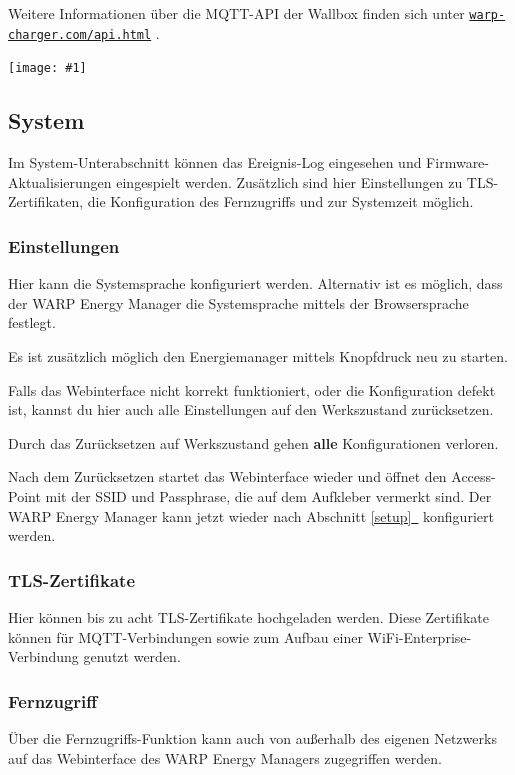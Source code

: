 \documentclass[a4paper,10pt]{article}
\newcommand{\hint}[1]{\begin{tcolorbox}[colback=boxgray,colframe=black,coltext=
white,title=Hinweis,left*=2mm,right*=2mm,boxsep=1mm,bottom=1mm,top=1mm]#1\end{tcolorbox}}
\newcommand{\gfx}[1]{\texttt{[image: \#1]}}
\newcommand*{\fullref}[1]{Abschnitt \hyperref[{#1}]{\ref*{#1}~\nameref*{#1}}}
\newcommand\rurl[2]{%
  \href{#1}{\nolinkurl{#2}}%
}
\begin{document}
\begin{multicols*}{2}
    Weitere Informationen über die MQTT-API der Wallbox finden sich unter
	\rurl{https://warp-charger.com/api.html}{warp-charger.com/api.html}.

	\gfx{./img/resized/web_mqtt}

	\subsection{System}
    Im System-Unterabschnitt können das Ereignis-Log eingesehen und Firmware-Aktualisierungen eingespielt werden. Zusätzlich sind hier Einstellungen zu TLS-Zertifikaten, die Konfiguration des Fernzugriffs und zur Systemzeit möglich.
    
    \subsubsection{Einstellungen}
    \label{einstellungen}
    
    Hier kann die Systemsprache konfiguriert werden. Alternativ ist es möglich, dass der WARP Energy Manager
    die Systemsprache mittels der Browsersprache festlegt.
    
    Es ist zusätzlich möglich den Energiemanager mittels Knopfdruck neu zu starten.
    
	Falls das Webinterface nicht korrekt funktioniert, oder die Konfiguration defekt ist,
	kannst du hier auch alle Einstellungen auf den Werkszustand zurücksetzen.
	\hint{Durch das Zurücksetzen auf Werkszustand gehen \mbox{\textbf{alle}} Konfigurationen verloren.}
	Nach dem Zurücksetzen startet das Webinterface wieder und öffnet
	den Access-Point mit der SSID und Passphrase, die auf dem Aufkleber vermerkt
	sind. Der WARP Energy Manager kann jetzt wieder nach \fullref{setup} konfiguriert werden.
    
    
    \subsubsection{TLS-Zertifikate}
    Hier können bis zu acht TLS-Zertifikate hochgeladen werden. Diese Zertifikate können
    für MQTT-Verbindungen sowie zum Aufbau einer WiFi-Enterprise-Verbindung genutzt werden.
    
    \subsubsection{Fernzugriff}

    Über die Fernzugriffs-Funktion kann auch von außerhalb des eigenen Netzwerks auf das Webinterface des WARP Energy Managers zugegriffen werden.


\end{multicols*}
\end{document}

